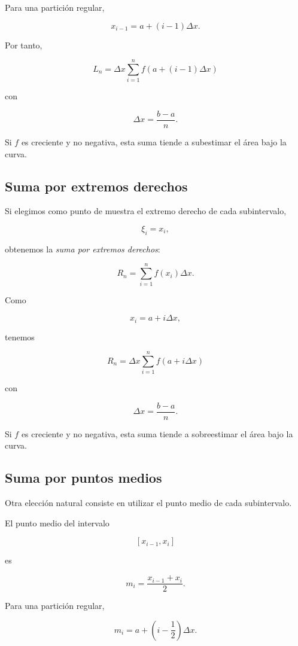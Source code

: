 \documentclass[12pt]{article}
\begin{document}
Para una partición regular,

\[
x_{i-1}
=
a+(i-1)\Delta x.
\]

Por tanto,

\[
\boxed{
L_n
=
\Delta x
\sum_{i=1}^{n}
f\left(a+(i-1)\Delta x\right)
}
\]

con

\[
\Delta x=\frac{b-a}{n}.
\]

Si $f$ es creciente y no negativa, esta suma tiende a subestimar el área
bajo la curva.

\subsection{Suma por extremos derechos}

Si elegimos como punto de muestra el extremo derecho de cada subintervalo,

\[
\xi_i=x_i,
\]

obtenemos la \emph{suma por extremos derechos}:

\[
R_n
=
\sum_{i=1}^{n}
f(x_i)\Delta x.
\]

Como

\[
x_i=a+i\Delta x,
\]

tenemos

\[
\boxed{
R_n
=
\Delta x
\sum_{i=1}^{n}
f\left(a+i\Delta x\right)
}
\]

con

\[
\Delta x=\frac{b-a}{n}.
\]

Si $f$ es creciente y no negativa, esta suma tiende a sobreestimar el área
bajo la curva.

\subsection{Suma por puntos medios}

Otra elección natural consiste en utilizar el punto medio de cada
subintervalo.

El punto medio del intervalo

\[
[x_{i-1},x_i]
\]

es

\[
m_i
=
\frac{x_{i-1}+x_i}{2}.
\]

Para una partición regular,

\[
m_i
=
a+\left(i-\frac{1}{2}\right)\Delta x.
\]
\end{document}
